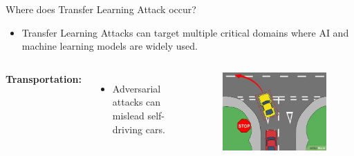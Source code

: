 \begin{frame}{Where does Transfer Learning Attack occur?}
    \begin{itemize}
        \item Transfer Learning Attacks can target multiple critical domains where AI and machine learning models are widely used.
    \end{itemize}

    \begin{columns}[T] %
        \textbf{\large Transportation:}
        \begin{itemize}
            \item Adversarial attacks can mislead self-driving cars.
        \end{itemize}
        \begin{figure}[h]
            \centering
            \includegraphics[width=0.5\linewidth]{img/StopToGo.png}
        \end{figure}


\end{columns}
\end{frame}
